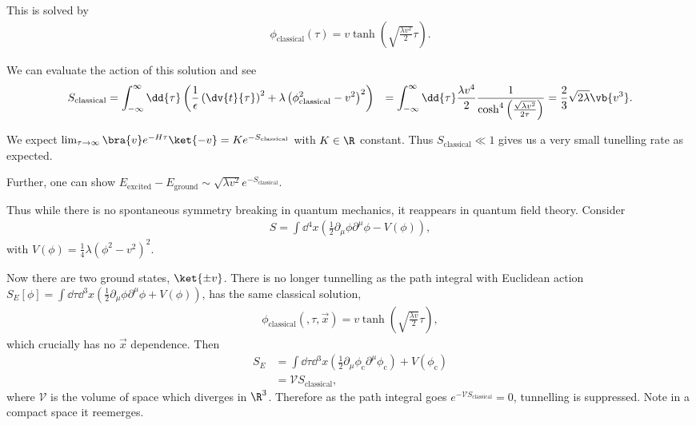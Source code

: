 This is solved by
\begin{align}
    \phi_\text{classical}\left( \tau \right) = v \tanh \left( \sqrt{\frac{\lambda v^2}{2}}  \tau \right) 
.\end{align}

We can evaluate the action of this solution and see
\begin{align}
    S_\text{classical} &= \int_{-\infty}^{\infty} \dd{\tau} \left( \frac{1}{\epsilon} \left( \dv{t}{\tau} \right)^2 + \lambda \left( \phi_\text{classical}^2 - v^2 \right)^2  \right) 
    &= \int_{-\infty}^{\infty} \dd{\tau} \frac{\lambda v^{4}}{2} \frac{1}{\cosh^{4} \left( \frac{\sqrt{\lambda v^2} }{2 \tau} \right) } = \frac{2}{3} \sqrt{2 \lambda}   \vb{v^3}
.\end{align}

We expect $\lim_{\tau \to \infty} \bra{v} e^{-H\tau} \ket{-v} = K e^{-S_\text{classical}} $ with $K \in \R$ constant. Thus $S_\text{classical} \ll 1$ gives us a very small tunelling rate as expected.

Further, one can show $E_\text{excited} - E_\text{ground} \sim  \sqrt{\lambda v^2}  e^{-S_\text{classical}}$.

Thus while there is no spontaneous symmetry breaking in quantum mechanics, it reappears in quantum field theory. Consider
\begin{align}
    S = \int \dd{^{4}x} \left( \frac{1}{2} \partial_\mu \phi \partial^{\mu} \phi - V \left( \phi \right)  \right) 
,\end{align}
with $V \left( \phi \right)  = \frac{1}{4} \lambda \left( \phi^2 - v^2 \right)^2$.

Now there are two ground states, $\ket{\pm v}$. There is no longer tunnelling as the path integral with Euclidean action $S_E \left[ \phi \right] = \int \dd{\tau} \dd{^3x} \left( \frac{1}{2} \partial_\mu \phi \partial^{\mu} \phi + V\left( \phi \right)  \right) $, has the same classical solution,
\begin{align}
    \phi_\text{classical}\left( ,\tau, \vec{x} \right) = v \tanh \left( \sqrt{\frac{\lambda v}{2}}  \tau \right) 
,\end{align}
which crucially has no $\vec{x}$ dependence. Then
\begin{align}
    S_E &= \int \dd{\tau} \dd{^3x} \left( \frac{1}{2} \partial_\mu \phi_\text{c} \partial^{\mu} \phi_\text{c} \right) + V \left( \phi_\text{c} \right)  \\
    &= \mathcal{V} S_\text{classical} 
,\end{align}
where $\mathcal{V}$ is the volume of space which diverges in $\R^3$. Therefore as the path integral goes $e^{-\mathcal{V}S_\text{classical}} = 0$, tunnelling is suppressed. Note in a compact space it reemerges.

